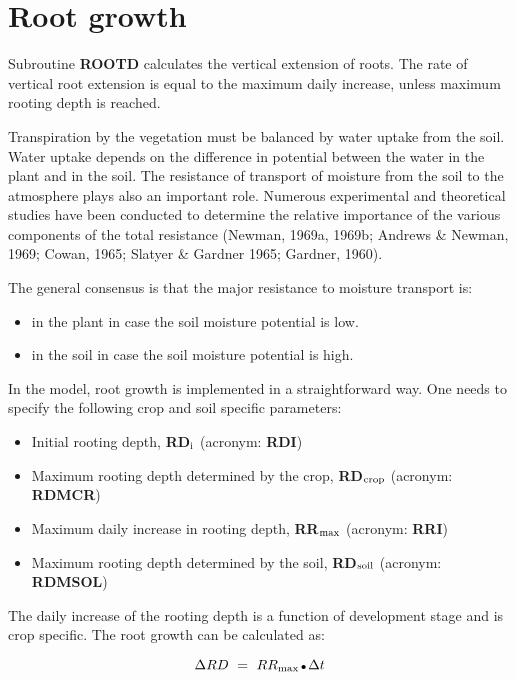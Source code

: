 \section{Root growth}

Subroutine {\bf ROOTD} calculates the vertical extension of roots. The rate of vertical root
extension is equal to the maximum daily increase, unless maximum rooting depth is
reached.

Transpiration by the vegetation must be balanced by water uptake from the soil. Water
uptake depends on the difference in potential between the water in the plant and in the
soil. The resistance of transport of moisture from the soil to the atmo\-sphere plays also an
important role. Numerous experimental and theoretical studies have been conducted to
determine the relative importance of the various components of the total resistance
(Newman, 1969a, 1969b; Andrews \& Newman, 1969; Cowan, 1965; Slatyer \& Gardner
1965; Gardner, 1960).

The general consensus is that the major resistance to moisture transport is:
\begin{itemize}
\item in the plant in case the soil moisture potential is low.
\item in the soil in case the soil moisture potential is high.
\end{itemize}

In the model, root growth is implemented in a straightforward way. One needs to specify
the following crop and soil specific parameters:
\begin{itemize}
\item Initial rooting depth, {\bf RD$_{{\rm i}}$} (acronym: {\bf RDI})\\
\item Maximum rooting depth determined by the crop, {\bf RD$_{{\rm crop}}$} (acronym: {\bf RDMCR})\\
\item Maximum daily increase in rooting depth, {\bf RR$_{{\rm max}}$} (acronym: {\bf RRI})
\item Maximum rooting depth determined by the soil, {\bf RD$_{{\rm soil}}$} (acronym: {\bf RDMSOL})
\end{itemize}

The daily increase of the rooting depth is a function of development stage and is crop
specific. The root growth can be calculated as:

\begin{equation}
\Delta RD~=~RR _{\max } \, {\rm \Bullet{0.75ex}}\, \Delta t
\end{equation}

